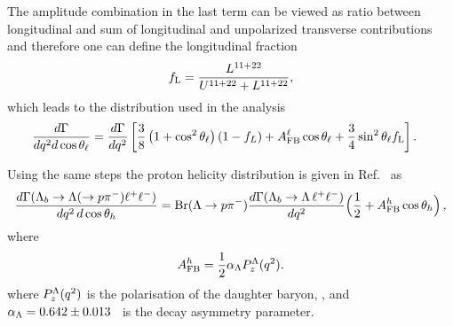 The amplitude combination in the last term can be viewed as ratio between longitudinal and sum of
longitudinal and unpolarized transverse contributions and therefore one can define the longitudinal fraction
\begin{equation}
f_{\rm L}=\frac{L^{11+22}}{U^{11+22}+L^{11+22}},
\end{equation}
which leads to the distribution used in the analysis
\begin{align}
\frac{d\Gamma}{dq^2d\cos\theta_\ell}=
\frac{d\Gamma}{dq^2}&\left[  \frac{3}{8}\left(1+\cos^2\theta_\ell\right)(1-f_L)+A_{\rm FB}^\ell\cos\theta_\ell +
   \frac{3}{4}\sin^2\theta_\ell f_{\rm L}\right]. 
   \label{eq:afbTh}
\end{align}

Using the same steps the proton helicity distribution is given in Ref.~\cite{Gutsche:2013pp} as
\begin{equation}
\frac{d\Gamma(\Lambda_{b}\to \Lambda(\to p \pi^{-})\ell^{+}\ell^{-})}
     {dq^2\,d\cos\theta_h} 
={\rm Br}(\Lambda \to p\pi^{-})
 \frac{d\Gamma(\Lambda_b \to \Lambda\, \ell^{+}\ell^{-})}{d q^2}
\Big(\frac{1}{2}+A_{\rm FB}^h\cos\theta_h\Big) \,,
\label{eq:afbBTh}
\end{equation}
where 
\begin{equation}
A_{\rm FB}^h=\frac{1}{2}\alpha_{\Lambda}P_z^\Lambda(q^2).
\end{equation} 
where $P_z^\Lambda(q^2)$ is the polarisation of the daughter baryon, \Lz,
and $\alpha_{\Lambda} = 0.642 \pm 0.013$~\cite{PDG2014} is the \Lz decay asymmetry parameter.



